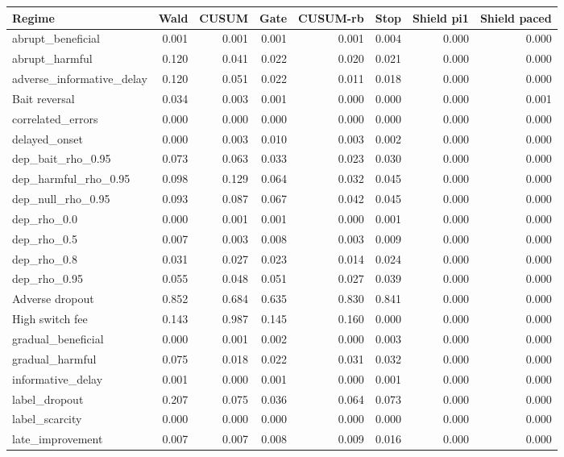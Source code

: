 \begin{tabular}{@{}l r r r r r r r@{}}
\toprule
Regime & Wald & CUSUM & Gate & CUSUM-rb & Stop & Shield pi1 & Shield paced \\
\midrule
abrupt\_beneficial & 0.001 & 0.001 & 0.001 & 0.001 & 0.004 & 0.000 & 0.000 \\
abrupt\_harmful & 0.120 & 0.041 & 0.022 & 0.020 & 0.021 & 0.000 & 0.000 \\
adverse\_informative\_delay & 0.120 & 0.051 & 0.022 & 0.011 & 0.018 & 0.000 & 0.000 \\
Bait reversal & 0.034 & 0.003 & 0.001 & 0.000 & 0.000 & 0.000 & 0.001 \\
correlated\_errors & 0.000 & 0.000 & 0.000 & 0.000 & 0.000 & 0.000 & 0.000 \\
delayed\_onset & 0.000 & 0.003 & 0.010 & 0.003 & 0.002 & 0.000 & 0.000 \\
dep\_bait\_rho\_0.95 & 0.073 & 0.063 & 0.033 & 0.023 & 0.030 & 0.000 & 0.000 \\
dep\_harmful\_rho\_0.95 & 0.098 & 0.129 & 0.064 & 0.032 & 0.045 & 0.000 & 0.000 \\
dep\_null\_rho\_0.95 & 0.093 & 0.087 & 0.067 & 0.042 & 0.045 & 0.000 & 0.000 \\
dep\_rho\_0.0 & 0.000 & 0.001 & 0.001 & 0.000 & 0.001 & 0.000 & 0.000 \\
dep\_rho\_0.5 & 0.007 & 0.003 & 0.008 & 0.003 & 0.009 & 0.000 & 0.000 \\
dep\_rho\_0.8 & 0.031 & 0.027 & 0.023 & 0.014 & 0.024 & 0.000 & 0.000 \\
dep\_rho\_0.95 & 0.055 & 0.048 & 0.051 & 0.027 & 0.039 & 0.000 & 0.000 \\
Adverse dropout & 0.852 & 0.684 & 0.635 & 0.830 & 0.841 & 0.000 & 0.000 \\
High switch fee & 0.143 & 0.987 & 0.145 & 0.160 & 0.000 & 0.000 & 0.000 \\
gradual\_beneficial & 0.000 & 0.001 & 0.002 & 0.000 & 0.003 & 0.000 & 0.000 \\
gradual\_harmful & 0.075 & 0.018 & 0.022 & 0.031 & 0.032 & 0.000 & 0.000 \\
informative\_delay & 0.001 & 0.000 & 0.001 & 0.000 & 0.001 & 0.000 & 0.000 \\
label\_dropout & 0.207 & 0.075 & 0.036 & 0.064 & 0.073 & 0.000 & 0.000 \\
label\_scarcity & 0.000 & 0.000 & 0.000 & 0.000 & 0.000 & 0.000 & 0.000 \\
late\_improvement & 0.007 & 0.007 & 0.008 & 0.009 & 0.016 & 0.000 & 0.000 \\

\end{tabular}
